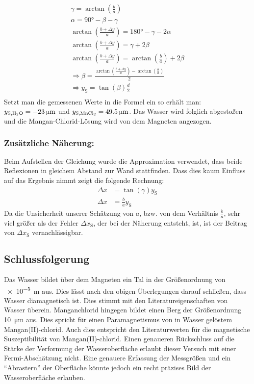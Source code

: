 \documentclass[
	a4paper,
	12pt,
	pagesize,
	ngerman
]{scrartcl}
\begin{document}
	\begin{gather*}
		\gamma = \arctan \left(\frac{b}{a}\right) \\
		\alpha = \ang{90} - \beta - \gamma \\
		\arctan \left(\frac{b+\Delta y}{a}\right) = \ang{180} - \gamma - 2\alpha \\
		\arctan \left(\frac{b+\Delta y}{a}\right) = \gamma + 2 \beta \\
		\arctan \left(\frac{b+\Delta y}{a}\right) =   \arctan \left(\frac{b}{a}\right) + 2 \beta \\
		\Rightarrow \beta = \frac{\arctan \left(\frac{b+\Delta y}{a}\right) -  \arctan \left(\frac{b}{a}\right)}{2} \\
		\Rightarrow y_\text{S} = \tan (\beta) \frac{d}{2}  \\
	\end{gather*}
	Setzt man die gemessenen Werte in die Formel ein so erhält man: $ y_{\text{S,\ce{H2O}}} = \SI{-23}{\micro \meter} $ und $y_{\text{S,\ce{MnCl2}}} = \SI{49,5}{ \micro \meter} $. Das Wasser wird folglich abgestoßen und die Mangan-Chlorid-Lösung wird von dem Magneten angezogen.
	
	\subsubsection*{Zusätzliche Näherung:}
	Beim Aufstellen der Gleichung wurde die Approximation verwendet, dass beide Reflexionen in gleichem Abstand zur Wand stattfinden. Dass dies kaum Einfluss auf das Ergebnis nimmt zeigt die folgende Rechnung: %
	\begin{align*}
		\Delta x &= \tan (\gamma) y_\text{S} \\
		\Delta x &= \frac{b}{a} y_\text{S}
	\end{align*}
	Da die Unsicherheit unserer Schätzung von $a$, bzw. von dem Verhältnis $\frac{b}{a}$, sehr viel größer als der Fehler $\Delta x_\text{S}$, der bei der Näherung entsteht, ist, ist der Beitrag von $\Delta x_\text{S}$ vernachlässigbar.

	\subsection{Schlussfolgerung}
	Das Wasser bildet über dem Magneten ein Tal in der Größenordnung von \SI{e-5}{m} aus. Dies lässt nach den obigen Überlegungen darauf schließen, dass Wasser diamagnetisch ist. Dies stimmt mit den Literatureigenschaften von Wasser überein.
	Manganchlorid hingegen bildet einen Berg der Größenordnung \SI{10}{\micro \meter} aus. Dies spricht für einen Paramagnetismus von in Wasser gelöstem Mangan(II)-chlorid. Auch dies entspricht den Literaturwerten für die magnetische Suszeptibilität von Mangan(II)-chlorid. Einen genaueren Rückschluss auf die Stärke der Verformung der Wasseroberfläche erlaubt dieser Versuch mit einer Fermi-Abschätzung nicht. Eine genauere Erfassung der Messgrößen und ein \enquote{Abrastern} der Oberfläche könnte jedoch ein recht präzises Bild der Wasseroberfläche erlauben. %
	
\end{document}

